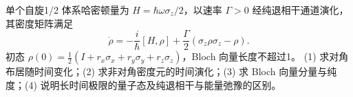 单个自旋1/2 体系哈密顿量为 \(H=\hbar\omega\sigma_z/2\)，以速率 \(\Gamma>0\) 经纯退相干通道演化，其密度矩阵满足
\[
\dot\rho=-\frac i\hbar[H,\rho]+\frac\Gamma2(\sigma_z\rho\sigma_z-\rho).
\]
初态 \(\rho(0)=\frac12(I+r_x\sigma_x+r_y\sigma_y+r_z\sigma_z)\)，Bloch 向量长度不超过1。
(1) 求对角布居随时间变化；(2) 求非对角密度元的时间演化；(3) 求 Bloch 向量分量与纯度；(4) 说明长时间极限的量子态及纯退相干与能量弛豫的区别。
